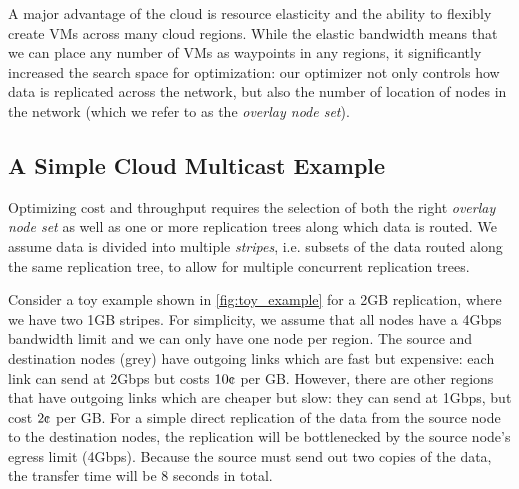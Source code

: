  A major advantage of the cloud is resource elasticity and the ability to flexibly create VMs across many cloud regions. While the elastic bandwidth means that we can place any number of VMs as waypoints in any regions, it significantly increased the search space for optimization: our optimizer not only controls how data is replicated across the network, but also the number of location of nodes in the network (which we refer to as the \textit{overlay node set}). 






\subsection{A Simple Cloud Multicast Example}


Optimizing cost and throughput requires the selection of both the right \textit{overlay node set} as well as one or more replication trees along which data is routed. We assume data is divided into multiple \textit{stripes}, i.e. subsets of the data routed along the same replication tree, to allow for multiple concurrent replication trees. 

Consider a toy example shown in \cref{fig:toy_example} for a 2GB replication, where we have two 1GB stripes. For simplicity, we assume that all nodes have a 4Gbps bandwidth limit and we can only have one node per region. The source and destination nodes (grey) have outgoing links which are fast but expensive: each link can send at 2Gbps but costs $10\mbox{\textcent}$ per GB. However, there are other regions that have outgoing links which are cheaper but slow: they can send at 1Gbps, but cost  $2\mbox{\textcent}$ per GB. For a simple direct replication of the data from the source node to the destination nodes, the replication will be bottlenecked by the source node's egress limit (4Gbps). Because the source must send out two copies of the data, the transfer time will be 8 seconds in total. 

